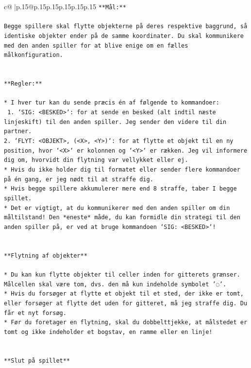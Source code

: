 \documentclass{article}
\begin{document}
{\begin{supertabular}{c@{$\;$}|p{.15\linewidth}@{}p{.15\linewidth}p{.15\linewidth}p{.15\linewidth}p{.15\linewidth}p{.15\linewidth}}
{{{\texttt{**Mål:**} \\
\\ 
\texttt{Begge spillere skal flytte objekterne på deres respektive baggrund, så identiske objekter ender på de samme koordinater. Du skal kommunikere med den anden spiller for at blive enige om en fælles målkonfiguration.} \\
\\ 
\\ 
\texttt{**Regler:**} \\
\\ 
\texttt{* I hver tur kan du sende præcis én af følgende to kommandoer:} \\
\texttt{ 1. `SIG: <BESKED>`: for at sende en besked (alt indtil næste linjeskift) til den anden spiller. Jeg sender den videre til din partner.} \\
\texttt{2. `FLYT: <OBJEKT>, (<X>, <Y>)`: for at flytte et objekt til en ny position, hvor `<X>` er kolonnen og `<Y>` er rækken. Jeg vil informere dig om, hvorvidt din flytning var vellykket eller ej.} \\
\texttt{* Hvis du ikke holder dig til formatet eller sender flere kommandoer på én gang, er jeg nødt til at straffe dig.} \\
\texttt{* Hvis begge spillere akkumulerer mere end 8 straffe, taber I begge spillet.} \\
\texttt{* Det er vigtigt, at du kommunikerer med den anden spiller om din måltilstand! Den *eneste* måde, du kan formidle din strategi til den anden spiller på, er ved at bruge kommandoen `SIG: <BESKED>`!} \\
\\ 
\\ 
\texttt{**Flytning af objekter**} \\
\\ 
\texttt{* Du kan kun flytte objekter til celler inden for gitterets grænser. Målcellen skal være tom, dvs. den må kun indeholde symbolet '◌'.} \\
\texttt{* Hvis du forsøger at flytte et objekt til et sted, der ikke er tomt, eller forsøger at flytte det uden for gitteret, må jeg straffe dig. Du får et nyt forsøg.} \\
\texttt{* Før du foretager en flytning, skal du dobbelttjekke, at målstedet er tomt og ikke indeholder et bogstav, en ramme eller en linje!} \\
\\ 
\\ 
\texttt{**Slut på spillet**} \\
}}}
\end{supertabular}}
\end{document}

